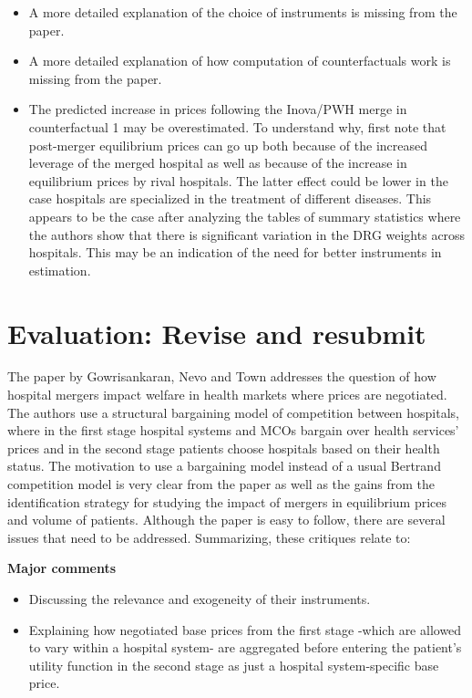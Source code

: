 \documentclass[12pt,english]{article}
\begin{document}
\begin{itemize}
\item A more detailed explanation of the choice of instruments is missing from the paper.
\item A more detailed explanation of how computation of counterfactuals work is missing from the paper.
\item The predicted increase in prices following the Inova/PWH merge in  counterfactual 1 may be overestimated. To understand why, first note that post-merger equilibrium prices can go up both because of the increased leverage of the merged hospital as well as because of the increase in equilibrium prices by rival hospitals. The latter effect could be lower in the case hospitals are specialized in the treatment of different diseases. This appears to be the case after analyzing the tables of summary statistics where the authors show that there is significant variation in the DRG weights across hospitals. This may be an indication of the need for better instruments in estimation.
\end{itemize}

\section{Evaluation: Revise and resubmit}

The paper by Gowrisankaran, Nevo and Town addresses the question of how hospital mergers impact welfare in health markets where prices are negotiated. The authors use a structural bargaining model of competition between hospitals, where in the first stage hospital systems and MCOs bargain over health services' prices and in the second stage patients choose hospitals based on their health status. The motivation to use a bargaining model instead of a usual Bertrand competition model is very clear from the paper as well as the gains from the  identification strategy for studying the impact of mergers in equilibrium prices and volume of patients. Although the paper is easy to follow, there are several issues that need to be addressed. Summarizing, these critiques relate to: 

\textbf{Major comments}
\begin{itemize}
\item Discussing the relevance and exogeneity of their instruments.
\item Explaining how negotiated base prices from the first stage -which are allowed to vary within a hospital system- are aggregated before entering the patient's utility function in the second stage as just a hospital system-specific base price.
\end{itemize}
\end{document}

